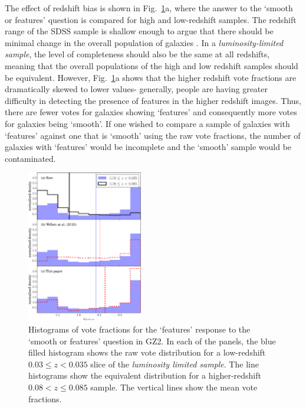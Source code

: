 \documentclass[useAMS,usenatbib]{mn2e}
\begin{document}
The effect of redshift bias is shown in Fig.~\ref{fig:vote_histograms}a, where the answer to the `smooth or features' question is compared for high and low-redshift samples. The redshift range of the SDSS sample is shallow enough to argue that there should be minimal change in the overall population of galaxies \citep{Bamford_09,Willett_13}. In a \textit{luminosity-limited sample}, the level of completeness should also be the same at all redshifts, meaning that the overall populations of the high and low redshift samples should be equivalent. However, Fig.~\ref{fig:vote_histograms}a shows that the higher redshift vote fractions are dramatically skewed to lower values- generally, people are having greater difficulty in detecting the presence of features in the higher redshift images. Thus, there are fewer votes for galaxies showing `features' and consequently more votes for galaxies being `smooth'. If one wished to compare a sample of galaxies with `features' against one that is `smooth' using the raw vote fractions, the number of galaxies with `features' would be incomplete and the `smooth' sample would be contaminated.

\begin{figure}
		\centering

        \includegraphics[width=0.45\textwidth]{Images/Bias/Biases/comparison_histogram.pdf}

        \caption{Histograms of vote fractions for the `features' response to the `smooth or features' question in GZ2. In each of the panels, the blue filled histogram shows the raw vote distribution for a low-redshift $0.03 \leq z < 0.035$ slice of the \textit{luminosity limited sample}. The line histograms show the equivalent distribution for a higher-redshift $0.08 < z \leq 0.085$ sample. The vertical lines show the mean vote fractions.}

        \label{fig:vote_histograms}

\end{figure}
\end{document}
